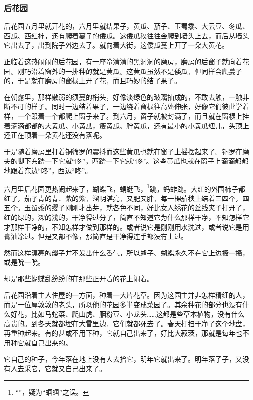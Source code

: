 \subsubsection{后花园}


\par 后花园五月里就开花的，六月里就结果子，黄瓜、茄子、玉蜀黍、大云豆、冬瓜、西瓜、西红柿，还有爬着蔓子的倭瓜。这倭瓜秧往往会爬到墙头上去，而后从墙头它出去了，出到院子外边去了。就向着大街，这倭瓜蔓上开了一朵大黄花。
\par 正临着这热闹闹的后花园，有一座冷清清的黑洞洞的磨房，磨房的后窗子就向着花园。刚巧沿着窗外的一排种的就是黄瓜。这黄瓜虽然不是倭瓜，但同样会爬蔓子的，于是就在磨房的窗棂上开了花，而且巧妙的结了果子。
\par 在朝露里，那样嫩弱的须蔓的梢头，好像淡绿色的玻璃抽成的，不敢去触，一触非断不可的样子。同时一边结着果子，一边绕着窗棂往高处伸张，好像它们彼此学着样，一个跟着一个都爬上窗子来了。到六月，窗子就被封满了，而且就在窗棂上挂着滴滴都都的大黄瓜、小黄瓜，瘦黄瓜、胖黄瓜，还有最小的小黄瓜纽儿，头顶上还正在顶着一朵黄花还没有落呢。
\par 于是随着磨房里打着铜筛罗的震抖而这些黄瓜也就在窗子上摇摆起来了。铜罗在磨夫的脚下东踏一下它就“咚”，西踏一下它就“咚”。这些黄瓜也就在窗子上滴滴都都地跟着东边“咚”，西边“咚”。
\par 六月里后花园更热闹起来了，蝴蝶飞，蜻蜓飞，\footnote{“”，疑为“蝈蝈”之误。}跳，蚂蚱跳。大红的外国柿子都红了，茄子青的青、紫的紫，溜明湛亮，又肥又胖，每一棵茄秧上结着三四个，四五个。玉蜀黍的缨子刚刚才出芽，就各色不同，好比女人绣花的丝线夹子打开了，红的绿的，深的浅的，干净得过分了，简直不知道它为什么那样干净，不知怎样它才那样干净的，不知怎样才做到那样的。或者说它是刚刚用水洗过，或者说它是用膏油涂过。但是又都不像，那简直是干净得连手都没有上过。
\par 然而这样漂亮的缨子并不发出什么香气，所以蜂子、蝴蝶永久不在它上边搔一搔，或是吮一吮。
\par 却是那些蝴蝶乱纷纷的在那些正开着的花上闹着。
\par 后花园沿着主人住屋的一方面，种着一大片花草。因为这园主并非怎样精细的人，而是一位厚敦敦的老头，所以他的花园多半变成菜园了。其余种花的部分也没有什么好花，比如马蛇菜、爬山虎、胭粉豆、小龙头……这都是些草本植物，没有什么高贵的。到冬天就都埋在大雪里边，它们就都死去了。春天打扫干净了这个地盘，再重种起来。有的甚或不用下种，它就自己出来了，好比大菽茨，那就是每年也不用种它就自己出来的。
\par 它自己的种子，今年落在地上没有人去拾它，明年它就出来了。明年落了子，又没有人去采它，它就又自己出来了。
